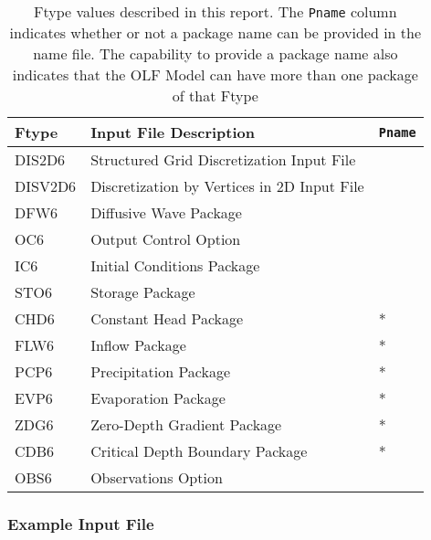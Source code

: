 \begin{table}[H]
\caption{Ftype values described in this report.  The \texttt{Pname} column indicates whether or not a package name can be provided in the name file.  The capability to provide a package name also indicates that the OLF Model can have more than one package of that Ftype}
\small
\begin{center}
\begin{tabular*}{\columnwidth}{l l l}
\hline
\hline
Ftype & Input File Description & \texttt{Pname}\\
\hline
DIS2D6 & Structured Grid Discretization Input File \\
DISV2D6 & Discretization by Vertices in 2D Input File \\
DFW6 & Diffusive Wave Package \\ 
OC6 & Output Control Option \\
IC6 & Initial Conditions Package \\
STO6 & Storage Package \\
CHD6 & Constant Head Package & * \\ 
FLW6 & Inflow Package & * \\ 
PCP6 & Precipitation Package & * \\
EVP6 & Evaporation Package & * \\
ZDG6 & Zero-Depth Gradient Package & * \\ 
CDB6 & Critical Depth Boundary Package & * \\ 
OBS6 & Observations Option \\
\hline 
\end{tabular*}
\label{table:ftype-olf}
\end{center}
\normalsize
\end{table}

\vspace{5mm}
\subsubsection{Example Input File}


